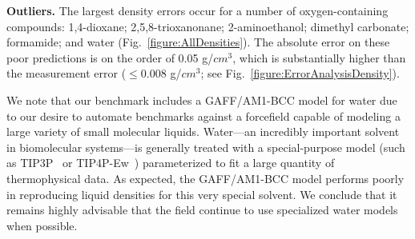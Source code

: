 \documentclass[aps,pre,twocolumn,nofootinbib,superscriptaddress,linenumbers]{revtex4-1}
\begin{document}

{\bf Outliers.}
The largest density errors occur for a number of oxygen-containing compounds: 1,4-dioxane; 2,5,8-trioxanonane; 2-aminoethanol; dimethyl carbonate; formamide; and water (Fig.~\ref{figure:AllDensities}).
The absolute error on these poor predictions is on the order of 0.05  g/$cm^{3}$, which is substantially higher than the measurement error ($\le0.008$ g/$cm^{3}$; see Fig.~\ref{figure:ErrorAnalysisDensity}).  

We note that our benchmark includes a GAFF/AM1-BCC model for water due to our desire to automate benchmarks against a forcefield capable of modeling a large variety of small molecular liquids.
Water---an incredibly important solvent in biomolecular systems---is generally treated with a special-purpose model (such as TIP3P~\cite{jorgensen1983comparison} or TIP4P-Ew~\cite{horn2004}) parameterized to fit a large quantity of thermophysical data.
As expected, the GAFF/AM1-BCC model performs poorly in reproducing liquid densities for this very special solvent.
We conclude that it remains highly advisable that the field continue to use specialized water models when possible.

\end{document}
